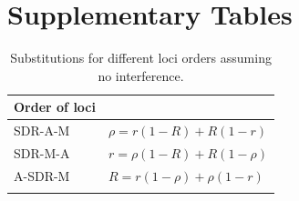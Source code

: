 \documentclass[12pt]{article}
\begin{document}
\section*{Supplementary Tables}

\begin{table}[ht]
\centering
\smallskip
\caption{
Substitutions for different loci orders assuming no interference. %
}
\begin{tabular}{l l}
\hline\hline
  Order of loci &   \\ [0.5ex] \hline
  SDR-A-M & $\rho=r(1-R)+R(1-r)$  \\
  SDR-M-A & $r=\rho(1-R)+R(1-\rho)$ \\ %
  A-SDR-M & $R=r(1-\rho)+\rho(1-r)$ \\ %
  \hline \hline
  \label{tab:chisubstitutions}
 \end{tabular}
\end{table}
\end{document}
